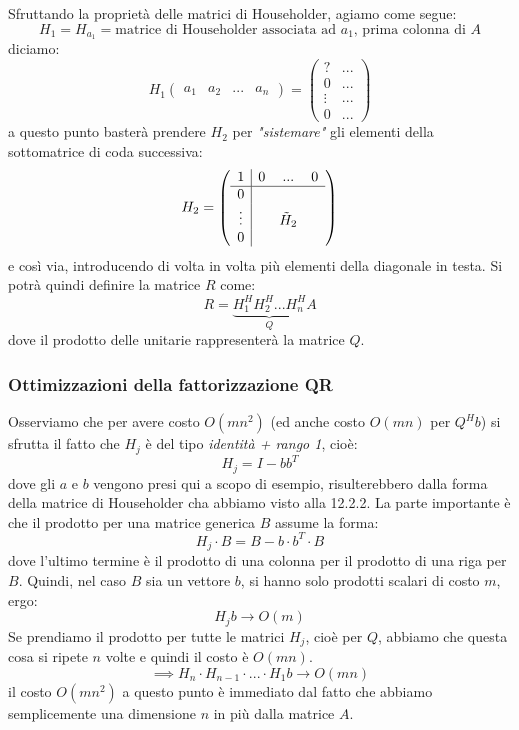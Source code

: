 \documentclass[a4paper,11pt]{article}
\begin{document}
Sfruttando la proprietà delle matrici di Householder, agiamo come segue:
$$
H_1 = H_{a_1} = \text{matrice di Householder associata ad $a_1$, prima colonna di $A$}
$$
diciamo:
$$
H_1 \begin{pmatrix}
	a_1 & a_2 & ... & a_n
\end{pmatrix} =
\begin{pmatrix}
	? & ... \\
	0 & ... \\ 
	\vdots & ... \\ 
	0 & ...
\end{pmatrix}
$$
a questo punto basterà prendere $H_2$ per \textit{"sistemare"} gli elementi della sottomatrice di coda successiva:
$$
H_2 = \left( \begin{array}{c| c c c}
	1 & 0 & ... & 0 \\
	\hline
	0 & & & \\
	\vdots & & \tilde{H}_2 & \\
	0 & & & \\
\end{array} \right)
$$
e così via, introducendo di volta in volta più elementi della diagonale in testa.
Si potrà quindi definire la matrice $R$ come:
$$
R = \underbrace{H_1^H H_2^H ... H_n^H}_Q A
$$
dove il prodotto delle unitarie rappresenterà la matrice $Q$.

\subsubsection{Ottimizzazioni della fattorizzazione QR}
Osserviamo che per avere costo $O(mn^2)$ (ed anche costo $O(mn)$ per $Q^H b$) si sfrutta il fatto che $H_j$ è del tipo \textit{identità + rango 1}, cioè:
$$
H_j = I - b b^T
$$
dove gli $a$ e $b$ vengono presi qui a scopo di esempio, risulterebbero dalla forma della matrice di Householder cha abbiamo visto alla 12.2.2.
La parte importante è che il prodotto per una matrice generica $B$ assume la forma:
$$
H_j \cdot B = B - b \cdot b^T \cdot B
$$
dove l'ultimo termine è il prodotto di una colonna per il prodotto di una riga per $B$.
Quindi, nel caso $B$ sia un vettore $b$, si hanno solo prodotti scalari di costo $m$, ergo:
$$
H_j b \rightarrow O(m)
$$
Se prendiamo il prodotto per tutte le matrici $H_j$, cioè per $Q$, abbiamo che questa cosa si ripete $n$ volte e quindi il costo è $O(mn)$.
$$
\implies H_n \cdot H_{n - 1} \cdot ... \cdot H_1 b \rightarrow O(mn)
$$
il costo $O(mn^2)$ a questo punto è immediato dal fatto che abbiamo semplicemente una dimensione $n$ in più dalla matrice $A$.
\end{document}
